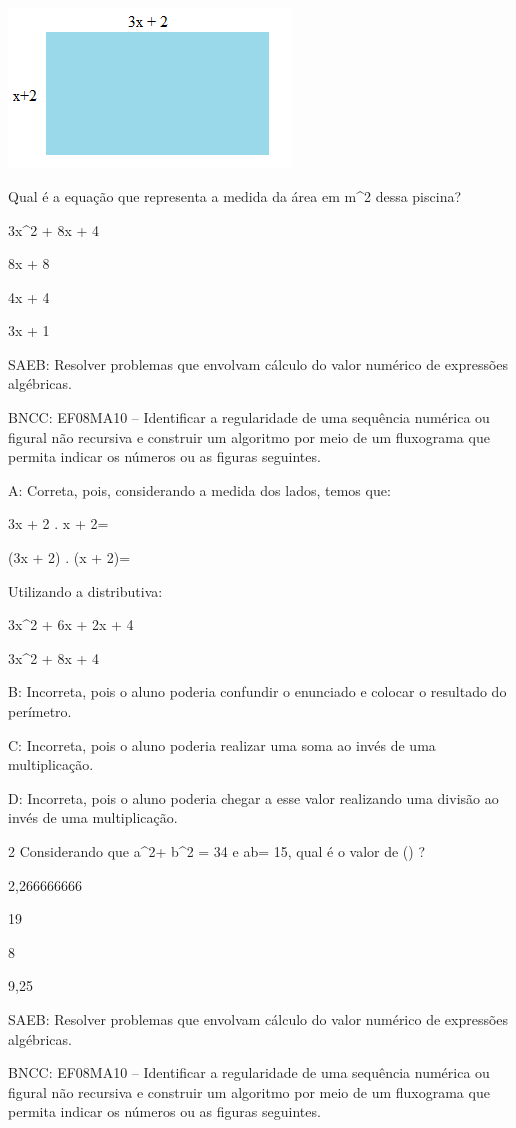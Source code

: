 {\includegraphics[width=2.9625in,height=1.67014in]{./imgSAEB_8_MAT/media/image6.png}

Qual é a equação que representa a medida da área em m^2 dessa piscina?
\item 3x^2 + 8x + 4
\item 8x + 8
\item 4x + 4
\item 3x + 1

SAEB: Resolver problemas que envolvam cálculo do valor numérico de
expressões algébricas.

BNCC: EF08MA10 -- Identificar a regularidade de uma sequência numérica
ou figural não recursiva e construir um algoritmo por meio de um
fluxograma que permita indicar os números ou as figuras seguintes.

A: Correta, pois, considerando a medida dos lados, temos que:

3x + 2 . x + 2=

(3x + 2) . (x + 2)=

Utilizando a distributiva:

3x^2 + 6x + 2x + 4

3x^2 + 8x + 4

B: Incorreta, pois o aluno poderia confundir o enunciado e colocar o
resultado do perímetro.

C: Incorreta, pois o aluno poderia realizar uma soma ao invés de uma
multiplicação.

D: Incorreta, pois o aluno poderia chegar a esse valor realizando uma
divisão ao invés de uma multiplicação.

\num{2} Considerando que a^2+ b^2 = 34 e ab= 15, qual é o valor de
() ?
\item 2,266666666
\item 19
\item 8
\item 9,25

SAEB: Resolver problemas que envolvam cálculo do valor numérico de
expressões algébricas.

BNCC: EF08MA10 -- Identificar a regularidade de uma sequência numérica
ou figural não recursiva e construir um algoritmo por meio de um
fluxograma que permita indicar os números ou as figuras seguintes.

}
